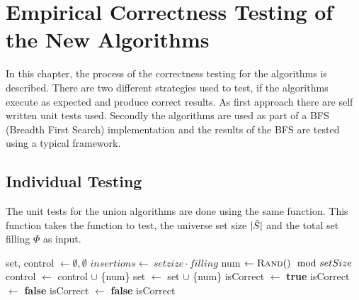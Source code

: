 

\chapter{Empirical Correctness Testing of the New Algorithms} \label{chap:correctness}
In this chapter, the process of the correctness testing for the algorithms is described. There are two different strategies used to test, if the algorithms execute as expected and produce correct results. As first approach there are self written unit tests used. Secondly the algorithms are used as part of a BFS (Breadth First Search) implementation and the results of the BFS are tested using a typical framework.
\section{Individual Testing}
The unit tests for the union algorithms are done using the same function. This function takes the function to test, the universe set size $|\Tilde{S}|$ and the total set filling $\Phi$ as input. 
\begin{algorithm}[h]
	\caption{– Single unit test for union operation algorithms.\\
		\textit{func}: union operation function.\\
		\textit{setSize}: size of the underlying set $\tilde{S}$.\\
		\textit{filling}: filling of the sets.}
	\label{algo:testCorrectness}
	\begin{algorithmic}[1]
		\State set, control $\gets \emptyset, \emptyset$
		\State $insertions \gets ~ setzize\cdot filling$
		\State {} 
		\State num $\gets \Call{Rand}{ } \mod{setSize}$ 
		\State control $\gets$ control $\cup$ \{num\}
		\State set $\gets$ set $\cup$ \{num\}
		\EndIf
		\EndFor
		\State {} 
		\State isCorrect $\gets$ \textbf{true}
		 
		\State isCorrect $\gets$ \textbf{false}
		\EndIf
		\EndFor
		 
		\State isCorrect $\gets$ \textbf{false}
		\EndIf
		\EndFor
		\State \Return isCorrect
		\EndProcedure
	\end{algorithmic}
\end{algorithm}

